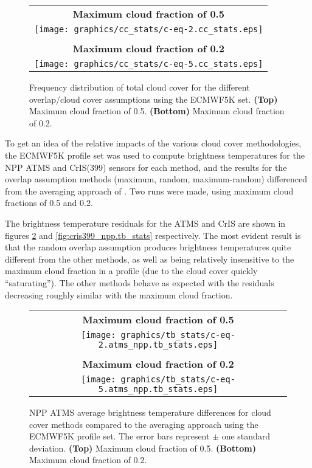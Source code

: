 \begin{figure}[H]
  \caption{Frequency distribution of total cloud cover for the different overlap/cloud cover assumptions using the ECMWF5K set. \textbf{(Top)} Maximum cloud fraction of 0.5. \textbf{(Bottom)} Maximum cloud fraction of 0.2. }
  \label{fig:cloud_cover_frequency}
  \centering
  \begin{tabular}{c}
    \sffamily\textbf{Maximum cloud fraction of 0.5} \\
    \texttt{[image: graphics/cc\_stats/c-eq-2.cc\_stats.eps]} \\\\
    \sffamily\textbf{Maximum cloud fraction of 0.2} \\
    \texttt{[image: graphics/cc\_stats/c-eq-5.cc\_stats.eps]}
  \end{tabular}
\end{figure}

To get an idea of the relative impacts of the various cloud cover methodologies, the ECMWF5K profile set was used to compute brightness temperatures for the NPP ATMS and CrIS(399) sensors for each method, and the results for the overlap assumption methods (maximum, random, maximum-random) differenced from the averaging approach of \citet{Geer_2009}. Two runs were made, using maximum cloud fractions of 0.5 and 0.2.

The brightness temperature residuals for the ATMS and CrIS are shown in figures \ref{fig:atms_npp.tb_stats} and \ref{fig:cris399_npp.tb_stats} respectively. The most evident result is that the random overlap assumption produces brightness temperatures quite different from the other methods, as well as being relatively insensitive to the maximum cloud fraction in a profile (due to the cloud cover quickly ``saturating''). The other methods behave as expected with the residuals decreasing roughly similar with the maximum cloud fraction.

\begin{figure}[H]
  \caption{NPP ATMS average brightness temperature differences for cloud cover methods compared to the averaging approach using the ECMWF5K profile set. The error bars represent $\pm$ one standard deviation. \textbf{(Top)} Maximum cloud fraction of 0.5. \textbf{(Bottom)} Maximum cloud fraction of 0.2. }
  \label{fig:atms_npp.tb_stats}
  \centering
  \begin{tabular}{c}
    \\
    \sffamily\textbf{Maximum cloud fraction of 0.5} \\
    \texttt{[image: graphics/tb\_stats/c-eq-2.atms\_npp.tb\_stats.eps]} \\\\
    \sffamily\textbf{Maximum cloud fraction of 0.2} \\
    \texttt{[image: graphics/tb\_stats/c-eq-5.atms\_npp.tb\_stats.eps]}
  \end{tabular}
\end{figure}

